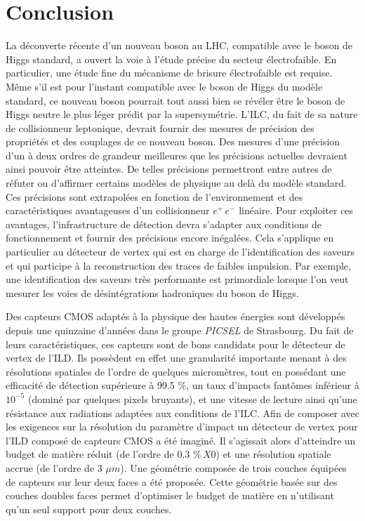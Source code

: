 \chapter*{Conclusion}

La d\'ecouverte r\'ecente d'un nouveau boson au LHC, compatible avec le boson de Higgs standard, a ouvert la voie \`a l'\'etude pr\'ecise du secteur \'electrofaible. En particulier, une \'etude fine du m\'ecanisme de brisure \'electrofaible est requise. Même s'il est  pour l'instant compatible avec le boson de Higgs du mod\`ele standard, ce nouveau boson pourrait tout aussi bien se r\'ev\'eler \^etre le boson de Higgs neutre le plus l\'eger pr\'edit par la supersym\'etrie. L'ILC, du fait de sa nature de collisionneur leptonique,  devrait fournir des mesures de pr\'ecision des propri\'et\'es et des couplages de ce nouveau boson. Des mesures d'une pr\'ecision d'un \`a deux ordres de grandeur meilleures que les pr\'ecisions actuelles devraient ainsi pouvoir \^etre atteintes. De telles pr\'ecisions permettront entre autres de réfuter ou d'affirmer certains mod\`eles de physique au delà du mod\`ele standard. Ces pr\'ecisions sont extrapol\'ees en fonction de l'environnement et des caract\'eristiques avantageuses d'un collisionneur $e^+ \, e^-$ lin\'eaire. Pour exploiter ces avantages, l'infrastructure de d\'etection devra s'adapter aux conditions de fonctionnement et fournir des pr\'ecisions encore in\'egal\'ees. Cela s'applique en particulier au d\'etecteur de vertex qui est en charge de l'identification des saveurs et qui participe \`a la reconstruction des traces de faibles impulsion. Par exemple, une identification des saveurs tr\`es performante est primordiale lorsque l'on veut mesurer les voies de d\'esint\'egrations hadroniques du boson de Higgs. 

\medskip

Des capteurs CMOS adapt\'es \`a la physique des hautes énergies sont d\'evelopp\'es depuis une quinzaine d'ann\'ees dans le groupe \textit{PICSEL} de Strasbourg. Du fait de leurs caract\'eristiques, ces capteurs sont de bons candidats pour le d\'etecteur de vertex de l'ILD. Ils poss\`edent en effet une granularit\'e importante menant \`a des r\'esolutions spatiales de l'ordre de quelques microm\`etres, tout en poss\'edant une efficacit\'e de d\'etection sup\'erieure \`a 99.5 $\%$, un taux d'impacts fant\^omes inf\'erieur \`a $10^{-5}$ (domin\'e par quelques pixels bruyants), et une vitesse de lecture ainsi qu'une r\'esistance aux radiations adapt\'ees aux conditions de l'ILC. Afin de composer avec les exigences sur la r\'esolution du param\`etre d'impact un d\'etecteur de vertex pour l'ILD compos\'e de capteurs CMOS a \'et\'e imagin\'e. Il s'agissait alors d'atteindre un budget de mati\`ere r\'eduit (de l'ordre de 0.3 $\% \, X0$) et une r\'esolution spatiale accrue (de l'ordre de 3 $\mu m$). Une g\'eom\'etrie compos\'ee de trois couches \'equip\'ees de capteurs sur leur deux faces a \'et\'e propos\'ee. Cette g\'eom\'etrie bas\'ee sur des couches doubles faces permet d'optimiser le budget de mati\`ere en n'utilisant qu'un seul support pour deux couches.

